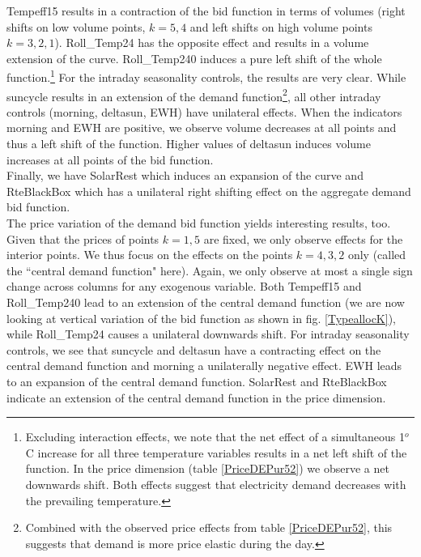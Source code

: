 Tempeff15 results in a contraction of the bid function in terms of volumes (right shifts on low volume points, $k=5,4$ and left shifts on high volume points $k=3,2,1$). Roll\_Temp24 has the opposite effect and results in a volume extension of the curve. Roll\_Temp240 induces a pure left shift of the whole function.\footnote{Excluding interaction effects, we note that the net effect of a simultaneous 1$^o$C increase for all three temperature variables results in a net left shift of the function. In the price dimension (table \ref{PriceDEPur52}) we observe a net downwards shift. Both effects suggest that electricity demand decreases with the prevailing temperature.}
For the intraday seasonality controls, the results are very clear. While suncycle results in an extension of the demand function\footnote{Combined with the observed price effects from table \ref{PriceDEPur52}, this suggests that demand is more price elastic during the day.}, all other intraday controls (morning, deltasun, EWH) have unilateral effects. When the indicators morning and EWH are positive, we observe volume decreases at all points and thus a left shift of the function. Higher values of deltasun induces volume increases at all points of the bid function.\\

Finally, we have SolarRest which induces an expansion of the curve and RteBlackBox which has a unilateral right shifting effect on the aggregate demand bid function. \\

The price variation of the demand bid function yields interesting results, too. Given that the prices of points $k=1,5$ are fixed, we only observe effects for the interior points. We thus focus on the effects on the points $k=4,3,2$ only (called the ``central demand function" here). Again, we only observe at most a single sign change across columns for any exogenous variable. Both Tempeff15 and Roll\_Temp240 lead to an extension of the central demand function (we are now looking at vertical variation of the bid function as shown in fig. \ref{TypeallocK}), while Roll\_Temp24 causes a unilateral downwards shift. For intraday seasonality controls, we see that suncycle and deltasun have a contracting effect on the central demand function and morning a unilaterally negative effect. EWH leads to an expansion of the central demand function. 
SolarRest and RteBlackBox indicate an extension of the central demand function in the price dimension. \\

